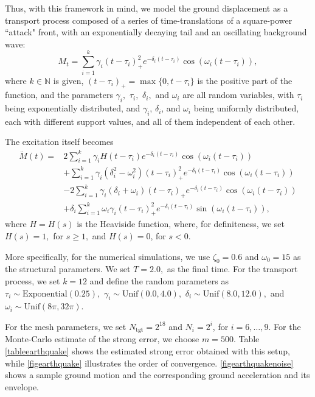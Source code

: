 \documentclass[reqno,12pt]{amsart}
\theoremstyle{plain} %
\theoremstyle{definition} %
\begin{document}
Thus, with this framework in mind, we model the ground displacement as a transport process composed of a series of time-translations of a square-power ``attack" front, with an exponentially decaying tail and an oscillating background wave:
\begin{equation}
    M_t = \sum_{i=1}^k \gamma_i (t - \tau_i)_+^2 e^{-\delta_i (t - \tau_i)}\cos(\omega_i (t - \tau_i)),
\end{equation}
where $k\in \mathbb{N}$ is given, $(t-\tau_i)_+ = \max\{0, t - \tau_i\}$ is the positive part of the function, and the parameters $\gamma_i,$ $\tau_i,$ $\delta_i,$ and $\omega_i$ are all random variables, with $\tau_i$ being exponentially distributed, and $\gamma_i$, $\delta_i$, and $\omega_i$ being uniformly distributed, each with different support values, and all of them independent of each other.

The excitation itself becomes
\begin{align*}
    \ddot M(t) = & 2\sum_{i=1}^k\gamma_i H(t - \tau_i) e^{-\delta_i (t - \tau_i)}\cos(\omega_i (t - \tau_i)) \\
        & + \sum_{i=1}^k\gamma_i (\delta_i^2 - \omega_i^2)(t - \tau_i)_+^2 e^{-\delta_i (t - \tau_i)}\cos(\omega_i (t - \tau_i)) \\
        & -2\sum_{i=1}^k\gamma_i (\delta_i + \omega_i) (t - \tau_i)_+ e^{-\delta_i (t - \tau_i)}\cos(\omega_i (t - \tau_i)) \\
        & +\delta_i\sum_{i=1}^k\omega_i\gamma_i (t - \tau_i)_+^2 e^{-\delta_i (t - \tau_i)}\sin(\omega_i (t - \tau_i)),
\end{align*}
where $H = H(s)$ is the Heaviside function, where, for definiteness, we set $H(s) = 1,$ for $s \geq 1,$ and $H(s) = 0$, for $s < 0$.

More specifically, for the numerical simulations, we use $\zeta_0 = 0.6$ and $\omega_0 = 15$ as the structural parameters. We set $T = 2.0,$ as the final time. For the transport process, we set $k=12$ and define the random parameters as $\tau_i \sim \textrm{Exponential}(0.25),$ $\gamma_i \sim \textrm{Unif}(0.0, 4.0),$ $\delta_i \sim \textrm{Unif}(8.0, 12.0),$ and $\omega_i \sim \textrm{Unif}(8\pi, 32\pi).$

For the mesh parameters, we set $N_{\textrm{tgt}} = 2^{18}$ and $N_i = 2^i$, for $i=6, \ldots, 9$. For the Monte-Carlo estimate of the strong error, we choose $m= 500.$ Table \ref{tableearthquake} shows the estimated strong error obtained with this setup, while \cref{figearthquake} illustrates the order of convergence. \cref{figearthquakenoise} shows a sample ground motion and the corresponding ground acceleration and its envelope.
\end{document}
